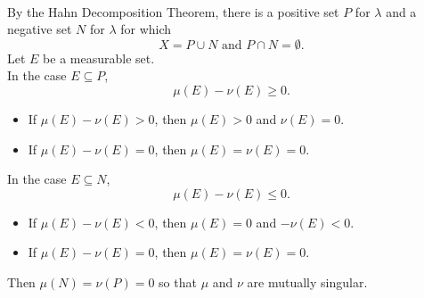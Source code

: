 \begin{enumerate}
\begin{enumerate}[label=(\roman*),align=left]
		\\By the Hahn Decomposition Theorem, there is a positive set $P$ for $\lambda$ and a negative set $N$ for $\lambda$ for which
		\[
			X=P\cup N\text{ and }P\cap N=\emptyset.	
		\]
		Let $E$ be a measurable set.
		\\In the case $E\subseteq P$,
		\[
			\mu(E)-\nu(E)\ge0.
		\]
		\begin{itemize}
			\item If $\mu(E)-\nu(E)>0$, then $\mu(E)>0$ and $\nu(E)=0$.
			\item If $\mu(E)-\nu(E)=0$, then $\mu(E)=\nu(E)=0$.
		\end{itemize}
		In the case $E\subseteq N$,
		\[
			\mu(E)-\nu(E)\le0.
		\]
		\begin{itemize}
			\item If $\mu(E)-\nu(E)<0$, then $\mu(E)=0$ and $-\nu(E)<0$.
			\item If $\mu(E)-\nu(E)=0$, then $\mu(E)=\nu(E)=0$.
		\end{itemize}
		Then $\mu(N)=\nu(P)=0$ so that $\mu$ and $\nu$ are mutually singular.
	\end{enumerate}
\end{enumerate}

